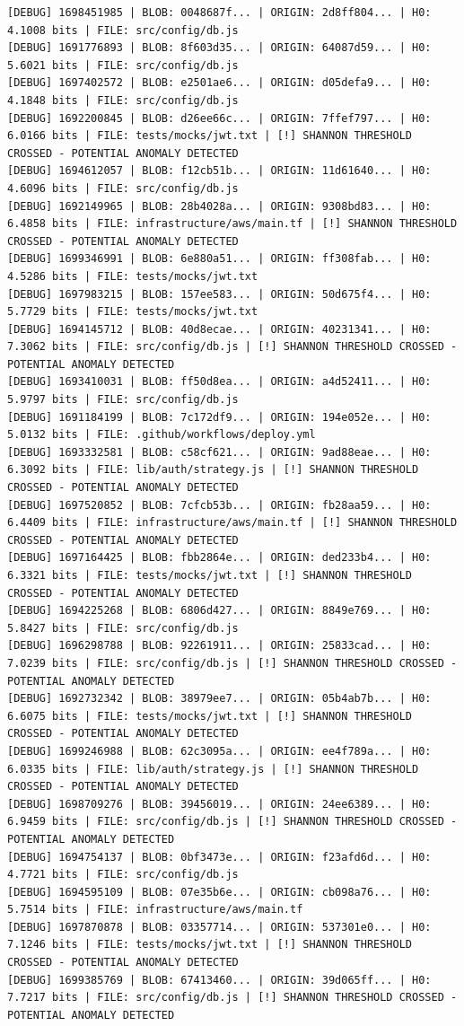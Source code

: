 \documentclass[12pt, a4paper, oneside]{report}
\begin{document}
\begin{lstlisting}[basicstyle=\tiny\ttfamily]
[DEBUG] 1698451985 | BLOB: 0048687f... | ORIGIN: 2d8ff804... | H0: 4.1008 bits | FILE: src/config/db.js
[DEBUG] 1691776893 | BLOB: 8f603d35... | ORIGIN: 64087d59... | H0: 5.6021 bits | FILE: src/config/db.js
[DEBUG] 1697402572 | BLOB: e2501ae6... | ORIGIN: d05defa9... | H0: 4.1848 bits | FILE: src/config/db.js
[DEBUG] 1692200845 | BLOB: d26ee66c... | ORIGIN: 7ffef797... | H0: 6.0166 bits | FILE: tests/mocks/jwt.txt | [!] SHANNON THRESHOLD CROSSED - POTENTIAL ANOMALY DETECTED
[DEBUG] 1694612057 | BLOB: f12cb51b... | ORIGIN: 11d61640... | H0: 4.6096 bits | FILE: src/config/db.js
[DEBUG] 1692149965 | BLOB: 28b4028a... | ORIGIN: 9308bd83... | H0: 6.4858 bits | FILE: infrastructure/aws/main.tf | [!] SHANNON THRESHOLD CROSSED - POTENTIAL ANOMALY DETECTED
[DEBUG] 1699346991 | BLOB: 6e880a51... | ORIGIN: ff308fab... | H0: 4.5286 bits | FILE: tests/mocks/jwt.txt
[DEBUG] 1697983215 | BLOB: 157ee583... | ORIGIN: 50d675f4... | H0: 5.7729 bits | FILE: tests/mocks/jwt.txt
[DEBUG] 1694145712 | BLOB: 40d8ecae... | ORIGIN: 40231341... | H0: 7.3062 bits | FILE: src/config/db.js | [!] SHANNON THRESHOLD CROSSED - POTENTIAL ANOMALY DETECTED
[DEBUG] 1693410031 | BLOB: ff50d8ea... | ORIGIN: a4d52411... | H0: 5.9797 bits | FILE: src/config/db.js
[DEBUG] 1691184199 | BLOB: 7c172df9... | ORIGIN: 194e052e... | H0: 5.0132 bits | FILE: .github/workflows/deploy.yml
[DEBUG] 1693332581 | BLOB: c58cf621... | ORIGIN: 9ad88eae... | H0: 6.3092 bits | FILE: lib/auth/strategy.js | [!] SHANNON THRESHOLD CROSSED - POTENTIAL ANOMALY DETECTED
[DEBUG] 1697520852 | BLOB: 7cfcb53b... | ORIGIN: fb28aa59... | H0: 6.4409 bits | FILE: infrastructure/aws/main.tf | [!] SHANNON THRESHOLD CROSSED - POTENTIAL ANOMALY DETECTED
[DEBUG] 1697164425 | BLOB: fbb2864e... | ORIGIN: ded233b4... | H0: 6.3321 bits | FILE: tests/mocks/jwt.txt | [!] SHANNON THRESHOLD CROSSED - POTENTIAL ANOMALY DETECTED
[DEBUG] 1694225268 | BLOB: 6806d427... | ORIGIN: 8849e769... | H0: 5.8427 bits | FILE: src/config/db.js
[DEBUG] 1696298788 | BLOB: 92261911... | ORIGIN: 25833cad... | H0: 7.0239 bits | FILE: src/config/db.js | [!] SHANNON THRESHOLD CROSSED - POTENTIAL ANOMALY DETECTED
[DEBUG] 1692732342 | BLOB: 38979ee7... | ORIGIN: 05b4ab7b... | H0: 6.6075 bits | FILE: tests/mocks/jwt.txt | [!] SHANNON THRESHOLD CROSSED - POTENTIAL ANOMALY DETECTED
[DEBUG] 1699246988 | BLOB: 62c3095a... | ORIGIN: ee4f789a... | H0: 6.0335 bits | FILE: lib/auth/strategy.js | [!] SHANNON THRESHOLD CROSSED - POTENTIAL ANOMALY DETECTED
[DEBUG] 1698709276 | BLOB: 39456019... | ORIGIN: 24ee6389... | H0: 6.9459 bits | FILE: src/config/db.js | [!] SHANNON THRESHOLD CROSSED - POTENTIAL ANOMALY DETECTED
[DEBUG] 1694754137 | BLOB: 0bf3473e... | ORIGIN: f23afd6d... | H0: 4.7721 bits | FILE: src/config/db.js
[DEBUG] 1694595109 | BLOB: 07e35b6e... | ORIGIN: cb098a76... | H0: 5.7514 bits | FILE: infrastructure/aws/main.tf
[DEBUG] 1697870878 | BLOB: 03357714... | ORIGIN: 537301e0... | H0: 7.1246 bits | FILE: tests/mocks/jwt.txt | [!] SHANNON THRESHOLD CROSSED - POTENTIAL ANOMALY DETECTED
[DEBUG] 1699385769 | BLOB: 67413460... | ORIGIN: 39d065ff... | H0: 7.7217 bits | FILE: src/config/db.js | [!] SHANNON THRESHOLD CROSSED - POTENTIAL ANOMALY DETECTED
\end{lstlisting}
\end{document}
